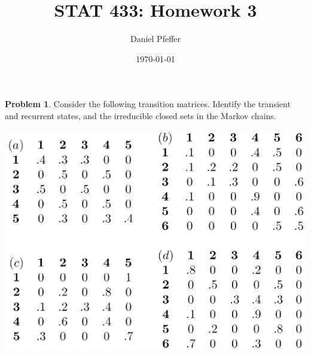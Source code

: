 \documentclass[oneside,reqno]{amsart}
\title{STAT 433: Homework 3}
\author{Daniel Pfeffer}
\date{\today}
\theoremstyle{definition}
\newtheorem{prob}{Problem}
\begin{document}
\maketitle


\begin{prob}
Consider the following transition matrices. Identify the transient and recurrent states, and the irreducible closed sets in the Markov chains.
\begin{center}
\includegraphics[scale=0.33]{q1-matrices}
\end{center}
\end{prob}
\end{document}
